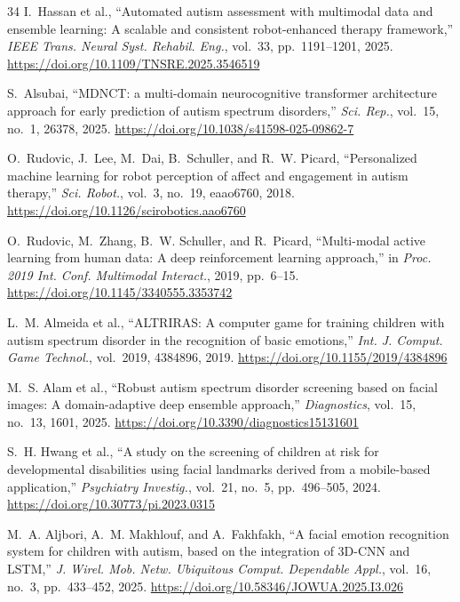 \documentclass[3p,twocolumn,times]{elsarticle}
\begin{document}
\begin{thebibliography}{34}
		I.~Hassan et al.,
		``Automated autism assessment with multimodal data and ensemble learning: A
		scalable and consistent robot-enhanced therapy framework,''
		\textit{IEEE Trans. Neural Syst. Rehabil. Eng.}, vol.~33, pp.~1191--1201, 2025.
		\url{https://doi.org/10.1109/TNSRE.2025.3546519}
		
		S.~Alsubai,
		``MDNCT: a multi-domain neurocognitive transformer architecture approach for
		early prediction of autism spectrum disorders,''
		\textit{Sci. Rep.}, vol.~15, no.~1, 26378, 2025.
		\url{https://doi.org/10.1038/s41598-025-09862-7}
		
		O.~Rudovic, J.~Lee, M.~Dai, B.~Schuller, and R.~W. Picard,
		``Personalized machine learning for robot perception of affect and engagement in
		autism therapy,''
		\textit{Sci. Robot.}, vol.~3, no.~19, eaao6760, 2018.
		\url{https://doi.org/10.1126/scirobotics.aao6760}
		
		O.~Rudovic, M.~Zhang, B.~W. Schuller, and R.~Picard,
		``Multi-modal active learning from human data: A deep reinforcement learning
		approach,''
		in \textit{Proc. 2019 Int. Conf. Multimodal Interact.}, 2019, pp.~6--15.
		\url{https://doi.org/10.1145/3340555.3353742}
		
		L.~M. Almeida et al.,
		``ALTRIRAS: A computer game for training children with autism spectrum disorder
		in the recognition of basic emotions,''
		\textit{Int. J. Comput. Game Technol.}, vol.~2019, 4384896, 2019.
		\url{https://doi.org/10.1155/2019/4384896}
		
		M.~S. Alam et al.,
		``Robust autism spectrum disorder screening based on facial images: A
		domain-adaptive deep ensemble approach,''
		\textit{Diagnostics}, vol.~15, no.~13, 1601, 2025.
		\url{https://doi.org/10.3390/diagnostics15131601}
		
		S.~H. Hwang et al.,
		``A study on the screening of children at risk for developmental disabilities
		using facial landmarks derived from a mobile-based application,''
		\textit{Psychiatry Investig.}, vol.~21, no.~5, pp.~496--505, 2024.
		\url{https://doi.org/10.30773/pi.2023.0315}
		
		M.~A. Aljbori, A.~M. Makhlouf, and A.~Fakhfakh,
		``A facial emotion recognition system for children with autism, based on the
		integration of 3D-CNN and LSTM,''
		\textit{J. Wirel. Mob. Netw. Ubiquitous Comput. Dependable Appl.}, vol.~16,
		no.~3, pp.~433--452, 2025.
		\url{https://doi.org/10.58346/JOWUA.2025.I3.026}
		

\end{thebibliography}
\end{document}
